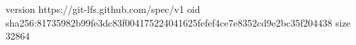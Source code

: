 version https://git-lfs.github.com/spec/v1
oid sha256:81735982b99fe3dc83f004175224041625fefef4ce7e8352cd9e2bc35f204438
size 32864
